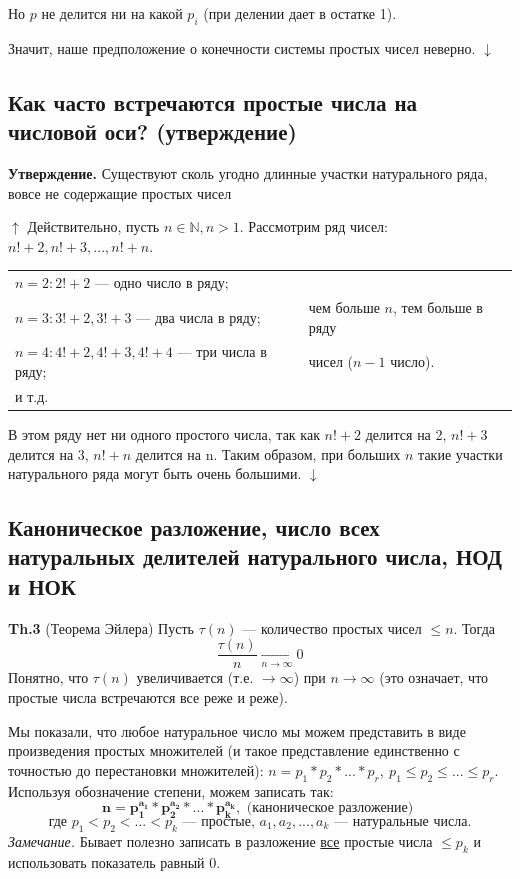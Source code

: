 \documentclass{article}
\begin{document}
            Но \( p \) не делится ни на какой \( p_i \) (при делении дает в остатке 1).

            Значит, наше предположение о конечности системы простых чисел неверно. \( \downarrow \)
            
        \subsection{Как часто встречаются простые числа на числовой оси? (утверждение)} 
        	\textbf{Утверждение.} Существуют сколь угодно длинные участки натурального ряда, вовсе не содержащие простых чисел

            \( \uparrow \) Действительно, пусть \( n \in \mathbb{N}, n > 1 \). Рассмотрим ряд чисел: \( n! + 2,n! + 3,...,n! + n \).

            \begin{tabular}{ll}
              \( n = 2: 2! + 2 \) --- одно число в ряду; &\\
              \( n = 3: 3! + 2, 3! + 3 \) --- два числа в ряду; & чем больше \( n \), тем больше в ряду\\
              \( n = 4: 4! + 2, 4! + 3, 4! + 4 \) --- три числа в ряду; & чисел (\( n - 1 \) число).\\
              и т.д. &\\
            \end{tabular}

            В этом ряду нет ни одного простого числа, так как \( n! + 2 \) делится на 2, \( n! + 3 \) делится на 3, \( n! + n \) делится на n. Таким образом, при больших \( n \) такие участки натурального ряда могут быть очень большими. \( \downarrow \) 
            
        \subsection{Каноническое разложение, число всех натуральных делителей натурального числа, НОД и НОК}
            \textbf{Th.3} (Теорема Эйлера) Пусть \( \tau(n) \) --- количество простых чисел \( \leq n \). Тогда \[ \frac{\tau(n)}{n} \xrightarrow[n \rightarrow \infty]{} 0 \]
            Понятно, что \( \tau(n) \) увеличивается (т.е. \( \rightarrow \infty \)) при \( n \rightarrow \infty \) (это означает, что простые числа встречаются все реже и реже).

            Мы показали, что любое натуральное число мы можем представить в виде произведения простых множителей (и такое представление единственно с точностью до перестановки множителей): \( n = p_1*p_2*...*p_r,\ p_1 \leq p_2 \leq ... \leq p_r \). Используя обозначение степени, можем записать так: \[ \mathbf{n = p_1^{a_1}*p_2^{a_2}*...*p_k^{a_k}}, \textrm{ (каноническое разложение) } \] 
            \[ \textrm{где } p_1 < p_2 < ... < p_k \textrm{ --- простые, } a_1, a_2, ..., a_k \textrm{ --- натуральные числа.} \]
            \textit{Замечание.} Бывает полезно записать в разложение \underline{все} простые числа \( \leq p_k \) и использовать показатель равный 0.
\end{document}
